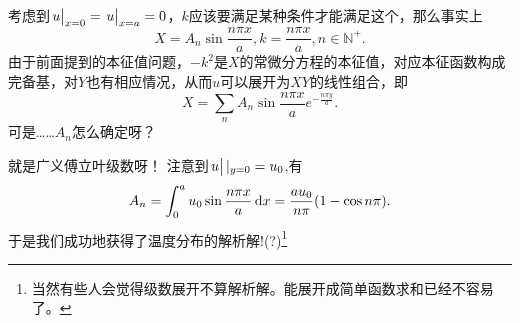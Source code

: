 \documentclass[12pt,a4paper,openany,twoside]{book}
\numberwithin{equation}{section}
\begin{document}
        考虑到$\eval{u}_{x=0}=\eval{u}_{x=a}=0$，$k$应该要满足某种条件才能满足这个，那么事实上
        \begin{equation}
          X=A_n\sin{\frac{n\pi x}{a}},k=\frac{n\pi x}{a},n\in\mathbb{N}^+.
        \end{equation}
        由于前面提到的本征值问题，$-k^2$是$X$的常微分方程的本征值，对应本征函数构成完备基，对$Y$也有相应情况，从而$u$可以展开为$XY$的线性组合，即
        \begin{equation}
          X=\sum_n{A_n\sin{\frac{n\pi x}{a}}e^{-\frac{n\pi y}{a}}}.
        \end{equation}
        可是……$A_n$怎么确定呀？
        
        就是广义傅立叶级数呀！
        注意到$\eval{u}|_{y=0}=u_0$,有
        \begin{equation}
          A_n=\int^a_0{u_0\sin{\frac{n\pi x}{a}}\dd{x}}=\frac{a u_0}{n\pi}\qty(1-\cos{n\pi}) .
        \end{equation}
        于是我们成功地获得了温度分布的解析解!(?)\footnote{当然有些人会觉得级数展开不算解析解。能展开成简单函数求和已经不容易了。}
\end{document}
